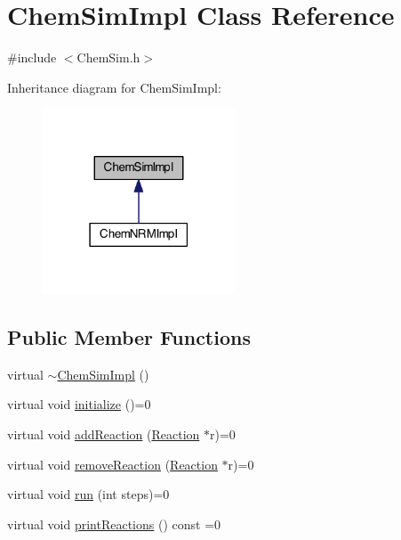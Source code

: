 \hypertarget{classChemSimImpl}{\section{Chem\-Sim\-Impl Class Reference}
\label{classChemSimImpl}
}


{\ttfamily \#include $<$Chem\-Sim.\-h$>$}



Inheritance diagram for Chem\-Sim\-Impl\-:\nopagebreak
\begin{figure}[H]
\begin{center}
\leavevmode
\includegraphics[width=162pt]{classChemSimImpl__inherit__graph}
\end{center}
\end{figure}
\subsection*{Public Member Functions}
\begin{DoxyCompactItemize}
\item 
virtual \hyperlink{classChemSimImpl_a60af355fee7857f7fdcb5fba63ed713c}{$\sim$\-Chem\-Sim\-Impl} ()
\item 
virtual void \hyperlink{classChemSimImpl_a8050874ed2646d6632ec9df1704c86c4}{initialize} ()=0
\item 
virtual void \hyperlink{classChemSimImpl_ab47ad93c8a2b23f83244d6bc1369f03f}{add\-Reaction} (\hyperlink{classReaction}{Reaction} $\ast$r)=0
\item 
virtual void \hyperlink{classChemSimImpl_a2c4024b4ec1e4d615449db6f7430d1fc}{remove\-Reaction} (\hyperlink{classReaction}{Reaction} $\ast$r)=0
\item 
virtual void \hyperlink{classChemSimImpl_ab6d36727d7ed608bbeee6e5037827bc8}{run} (int steps)=0
\item 
virtual void \hyperlink{classChemSimImpl_a1c0d35dbca7647319a27fa7eaff7388b}{print\-Reactions} () const =0
\end{DoxyCompactItemize}



